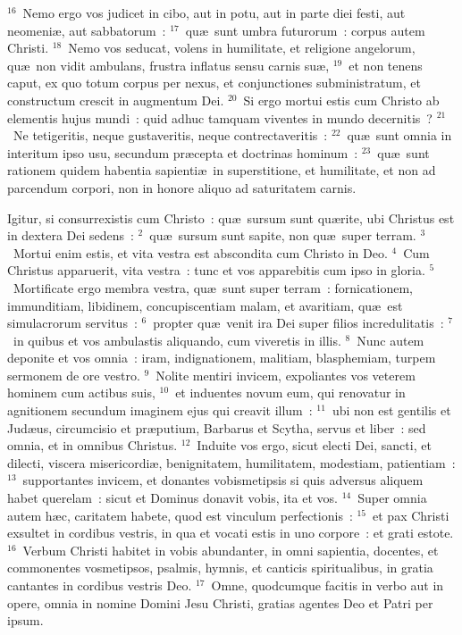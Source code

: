 ${}^{16}$~Nemo ergo vos judicet in cibo, aut in potu, aut in parte diei festi, aut neomeni\ae , aut sabbatorum~:
${}^{17}$~qu\ae\ sunt umbra futurorum~: corpus autem Christi.
${}^{18}$~Nemo vos seducat, volens in humilitate, et religione angelorum, qu\ae\ non vidit ambulans, frustra inflatus sensu carnis su\ae ,
${}^{19}$~et non tenens caput, ex quo totum corpus per nexus, et conjunctiones subministratum, et constructum crescit in augmentum Dei.
${}^{20}$~Si ergo mortui estis cum Christo ab elementis hujus mundi~: quid adhuc tamquam viventes in mundo decernitis~?
${}^{21}$~Ne tetigeritis, neque gustaveritis, neque contrectaveritis~:
${}^{22}$~qu\ae\ sunt omnia in interitum ipso usu, secundum pr\ae cepta et doctrinas hominum~:
${}^{23}$~qu\ae\ sunt rationem quidem habentia sapienti\ae\ in superstitione, et humilitate, et non ad parcendum corpori, non in honore aliquo ad saturitatem carnis.

\lettrine[lines=3,image=true,loversize=0.05,lraise=-0.03]{I}{}gitur, si consurrexistis cum Christo~: qu\ae\ sursum sunt qu\ae rite, ubi Christus est in dextera Dei sedens~:
${}^{2}$~qu\ae\ sursum sunt sapite, non qu\ae\ super terram.
${}^{3}$~Mortui enim estis, et vita vestra est abscondita cum Christo in Deo.
${}^{4}$~Cum Christus apparuerit, vita vestra~: tunc et vos apparebitis cum ipso in gloria.
${}^{5}$~Mortificate ergo membra vestra, qu\ae\ sunt super terram~: fornicationem, immunditiam, libidinem, concupiscentiam malam, et avaritiam, qu\ae\ est simulacrorum servitus~:
${}^{6}$~propter qu\ae\ venit ira Dei super filios incredulitatis~:
${}^{7}$~in quibus et vos ambulastis aliquando, cum viveretis in illis.
${}^{8}$~Nunc autem deponite et vos omnia~: iram, indignationem, malitiam, blasphemiam, turpem sermonem de ore vestro.
${}^{9}$~Nolite mentiri invicem, expoliantes vos veterem hominem cum actibus suis,
${}^{10}$~et induentes novum eum, qui renovatur in agnitionem secundum imaginem ejus qui creavit illum~:
${}^{11}$~ubi non est gentilis et Jud\ae us, circumcisio et pr\ae putium, Barbarus et Scytha, servus et liber~: sed omnia, et in omnibus Christus.
${}^{12}$~Induite vos ergo, sicut electi Dei, sancti, et dilecti, viscera misericordi\ae , benignitatem, humilitatem, modestiam, patientiam~:
${}^{13}$~supportantes invicem, et donantes vobismetipsis si quis adversus aliquem habet querelam~: sicut et Dominus donavit vobis, ita et vos.
${}^{14}$~Super omnia autem h\ae c, caritatem habete, quod est vinculum perfectionis~:
${}^{15}$~et pax Christi exsultet in cordibus vestris, in qua et vocati estis in uno corpore~: et grati estote.
${}^{16}$~Verbum Christi habitet in vobis abundanter, in omni sapientia, docentes, et commonentes vosmetipsos, psalmis, hymnis, et canticis spiritualibus, in gratia cantantes in cordibus vestris Deo.
${}^{17}$~Omne, quodcumque facitis in verbo aut in opere, omnia in nomine Domini Jesu Christi, gratias agentes Deo et Patri per ipsum.


